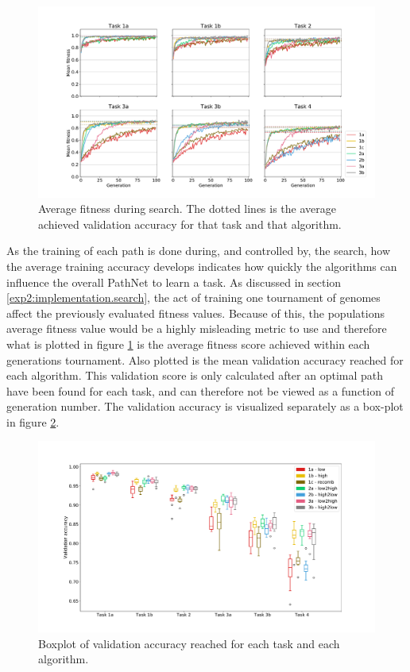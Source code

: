 \begin{figure}
    \includegraphics[width=1.2\textwidth,center]{Chapters/4.Experiments/exp2/figures/inuse/Training_accuracy.pdf}
    \caption[Fitness plot]{Average fitness during search. The dotted lines is the average achieved validation accuracy for that task and that algorithm.}
    \label{fig:search.accuracy}
\end{figure}

As the training of each path is done during, and controlled by, the search, how the average training accuracy develops indicates how quickly the algorithms can influence the overall PathNet to learn a task. As discussed in section \ref{exp2:implementation.search}, the act of training one tournament of genomes affect the previously evaluated fitness values. Because of this, the populations average fitness value would be a highly misleading metric to use and therefore what is plotted in figure \ref{fig:search.accuracy} is the average fitness score achieved within each generations tournament. Also plotted is the mean validation accuracy reached for each algorithm. This validation score is only calculated after an optimal path have been found for each task, and can therefore not be viewed as a function of generation number. The validation accuracy is visualized separately as a box-plot in figure \ref{fig:search.validation}.

\begin{figure}
    \includegraphics[width=1.2\textwidth, center]{Chapters/4.Experiments/exp2/figures/inuse/validation_boxplot.pdf}
    \caption[Validation accuracy plot]{Boxplot of validation accuracy reached for each task and each algorithm.}
    \label{fig:search.validation}
\end{figure}

